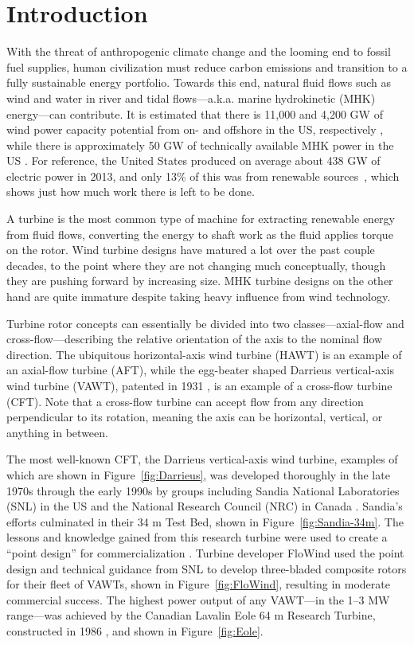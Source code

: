 \chapter{Introduction}

With the threat of anthropogenic climate change and the looming end to fossil
fuel supplies, human civilization must reduce carbon emissions \cite{Hansen2013}
and transition to a fully sustainable energy portfolio. Towards this end,
natural fluid flows such as wind and water in river and tidal flows---a.k.a.
marine hydrokinetic (MHK) energy---can contribute. It is estimated that there is
11,000 and 4,200 GW of wind power capacity potential from on- and offshore in
the US, respectively \cite{Lopez2012}, while there is approximately 50 GW of
technically available MHK power in the US \cite{Haas2011, Jacobson2012,
    Haas2013}. For reference, the United States produced on average about 438 GW of
electric power in 2013, and only 13\% of this was from renewable
sources~\cite{EIA2015}, which shows just how much work there is left to be done.

A turbine is the most common type of machine for extracting renewable energy
from fluid flows, converting the energy to shaft work as the fluid applies
torque on the rotor. Wind turbine designs have matured a lot over the past
couple decades, to the point where they are not changing much conceptually,
though they are pushing forward by increasing size. MHK turbine designs on the
other hand are quite immature despite taking heavy influence from wind
technology.

Turbine rotor concepts can essentially be divided into two classes---axial-flow
and cross-flow---describing the relative orientation of the axis to the nominal
flow direction. The ubiquitous horizontal-axis wind turbine (HAWT) is an example
of an axial-flow turbine (AFT), while the egg-beater shaped Darrieus
vertical-axis wind turbine (VAWT), patented in 1931 \cite{Darrieus1931}, is an
example of a cross-flow turbine (CFT). Note that a cross-flow turbine can accept
flow from any direction perpendicular to its rotation, meaning the axis can be
horizontal, vertical, or anything in between.

The most well-known CFT, the Darrieus vertical-axis wind turbine, examples of
which are shown in Figure~\ref{fig:Darrieus}, was developed thoroughly in the
late 1970s through the early 1990s by groups including Sandia National
Laboratories (SNL) in the US and the National Research Council (NRC) in Canada
\cite{Para2002}. Sandia's efforts culminated in their 34 m Test Bed, shown in
Figure~\ref{fig:Sandia-34m}. The lessons and knowledge gained from this research
turbine were used to create a ``point design'' for commercialization
\cite{Sutherland2012}. Turbine developer FloWind used the point design and
technical guidance from SNL to develop three-bladed composite rotors for their
fleet of VAWTs, shown in Figure~\ref{fig:FloWind}, resulting in moderate
commercial success. The highest power output of any VAWT---in the 1--3 MW
range---was achieved by the Canadian Lavalin Eole 64 m Research Turbine,
constructed in 1986 \cite{Para2002}, and shown in Figure~\ref{fig:Eole}.

